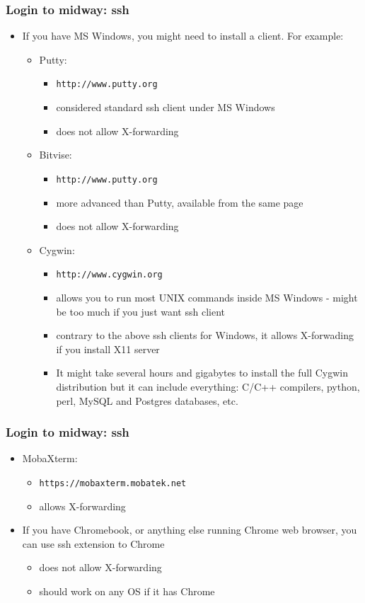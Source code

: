 \documentclass{beamer}
\begin{document}
\begin{frame}[fragile]
  \frametitle{Login to midway: ssh}
  \begin{itemize}
  \item If you have MS Windows, you might need to install a client. For example:
    \begin{itemize}
    \item Putty: 
      \begin{itemize}
      \item {\color{mycolorcli}\verb|http://www.putty.org|}
      \item considered standard ssh client under MS Windows
      \item does not allow X-forwarding
      \end{itemize}
    \item Bitvise:
      \begin{itemize}
      \item {\color{mycolorcli}\verb|http://www.putty.org|}
      \item more advanced than Putty, available from the same page
      \item does not allow X-forwarding
      \end{itemize}
    \item Cygwin:
      \begin{itemize}
      \item {\color{mycolorcli}\verb|http://www.cygwin.org|}
      \item allows you to run most UNIX commands inside MS Windows - might be too much if you just want ssh client
      \item contrary to the above ssh clients for Windows, it allows X-forwading if you install X11 server
      \item It might take several hours and gigabytes to install the full Cygwin distribution but it can include everything: C/C++ compilers, python, perl, MySQL and Postgres databases, etc.
      \end{itemize}
    \end{itemize}
  \end{itemize}
\end{frame}


\begin{frame}[fragile]
  \frametitle{Login to midway: ssh}
\begin{itemize}
  \item MobaXterm:
    \begin{itemize}
      \item {\color{mycolorcli}\verb|https://mobaxterm.mobatek.net|}
      \item allows X-forwarding
    \end{itemize}
  \item If you have Chromebook, or anything else running Chrome web browser, you can use ssh extension to Chrome 
    \begin{itemize}
    \item does not allow X-forwarding
    \item should work on any OS if it has Chrome
    \end{itemize}
\end{itemize}
\end{frame}
\end{document}
